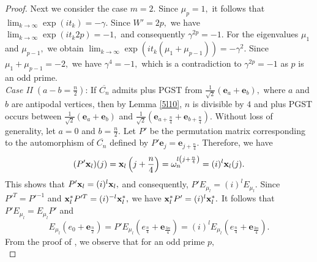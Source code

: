 \documentclass[12pt,a4paper]{article}
\def \e {{\bf e}}
\def \x {{\bf x}}
\def \e {{\mathbf e}}
\newcommand{\ob}[1]{\left(#1\right)}
\begin{document}
\begin{proof}
Next we consider the case $m=2.$ Since $\mu_p=1,$ it follows that $\displaystyle\lim_{k \to \infty}\exp{(it_k)}=-\gamma.$ Since $W'=2p,$ we have $\displaystyle\lim_{k \to \infty}\exp(it_k 2p)=-1,$ and consequently $\gamma^{2p}=-1.$ For the eigenvalues $\mu_1$ and $\mu_{p-1},$ we obtain $\displaystyle\lim_{k \to \infty}\exp(it_k(\mu_1+\mu_{p-1}) )=-\gamma^2.$ Since $\mu_1+\mu_{p-1}=-2,$ we have $\gamma^4=-1,$ which is a contradiction to $\gamma^{2p}=-1$ as $p$ is an odd prime.
 \\\textit{Case II} $(a-b=\frac{n}{2})$: If $\overline{C_n}$ admits plus PGST from $\frac{1}{\sqrt{2}}\ob{\e_a+\e_b},$ where $a$ and $b$ are antipodal vertices, then by Lemma \ref{5l10}, $n$ is divisible by $4$ and plus PGST occurs between $\frac{1}{\sqrt{2}}\ob{\e_a+\e_b}$ and $\frac{1}{\sqrt{2}}\ob{\e_{a+\frac{n}{4}}+\e_{b+\frac{n}{4}}}.$ Without loss of generality, let $a=0$ and $b=\frac{n}{2}.$
Let $P'$ be the permutation matrix corresponding to the automorphism of $\overline{C_n}$ defined by $P'\e_j=\e_{j+\frac{n}{4}}.$
   Therefore, we have
   \[(P'\x_l)(j)=\x_l\ob{j+\frac{n}{4}}=\omega_n^{l\ob{j+\frac{n}{4}}}=(i)^l\x_l(j).\]
   This shows that $P'\x_l=(i)^l \x_l,$ and consequently, $P'E_{\mu_l}=(i)^lE_{\mu_l}.$
  Since $P'^T=P'^{-1}$ and $\x_l^*P'^T=(i)^{-l}\x_l^*,$ we have $\x_l^*P'=(i)^l\x_l^*.$ It follows that $P'E_{\mu_l}=E_{\mu_l}P'$ and 
     \begin{equation}\label{5eq29}
         E_{\mu_l}\ob{e_0+\e_{\frac{n}{2}}}=P'E_{\mu_l}\ob{e_{\frac{n}{4}}+\e_{\frac{3n}{4}}}=(i)^lE_{\mu_l}\ob{e_{\frac{n}{4}}+\e_{\frac{3n}{4}}}.
          \end{equation}
          From the proof of \cite[Lemma 11]{pal4}, we observe that for an odd prime $p,$ 
\begin{equation}\label{5e22}

\end{equation}
\end{proof}
\end{document}
